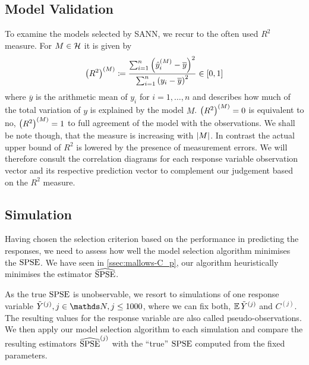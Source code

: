 		\medskip
		\begin{tcolorbox}[colframe=black,colbacktitle=white,coltitle=black, attach boxed title to top center={yshift=-2mm},enhanced, titlerule=0.1pt, boxrule=0.5pt, arc=5pt,title=Listing:\quad SANN algorithm]
			
		\end{tcolorbox}
		\medskip

		
	\subsection{Model Validation}
	\label{ssec:model-validation}
	
		To examine the models selected by SANN, we recur to the often used $R^2$ measure.
		For $M\in\mathcal{H}$ it is given by
		\[
			\left( R^2 \right)^{(M)} \coloneqq \frac {\sum_{i=1}^n \left( \hat{y}^{(M)}_i - \overline{y} \right)^2}{\sum_{i=1}^n \left( y_i - \overline{y} \right)^2} \in [0,1]
		\]
		where $\overline{y}$ is the arithmetic mean of $y_i$ for $i=1,\ldots,n$ and describes how much of the total variation of $y$ is explained by the model $M$.
		$\left( R^2 \right)^{(M)} = 0$ is equivalent to no, $\left( R^2 \right)^{(M)} = 1$ to full agreement of the model with the observations.
		We shall be note though, that the measure is increasing with $\left\vert M \right\vert$.
		In contrast the actual upper bound of $R^2$ is lowered by the presence of measurement errors.
		We will therefore consult the correlation diagrams for each response variable observation vector and its respective prediction vector to complement our judgement based on the $R^2$ measure.

	
	\subsection{Simulation}
	\label{ssec:simulation}
	
		Having chosen the selection criterion based on the performance in predicting the responses, we need to assess how well the model selection algorithm minimises the $\mathrm{SPSE}$.
		We have seen in \ref{ssec:mallows-C_p}, our algorithm heuristically minimises the estimator $\widehat{\mathrm{SPSE}}$.
		
		As the true $\mathrm{SPSE}$ is unobservable, we resort to simulations of one response variable $\tilde{Y}^{(j)}, j \in \SN, j \leq 1000$, where we can fix both, $\operatorname{\mathbb{E}}{\tilde{Y}^{(j)}}$ and $C^{(j)}$.
		The resulting values for the response variable are also called pseudo-observations.
		We then apply our model selection algorithm to each simulation and compare the resulting estimators $\widehat{\mathrm{SPSE}}^{(j)}$ with the \enquote{true} $\mathrm{SPSE}$ computed from the fixed parameters.
				
